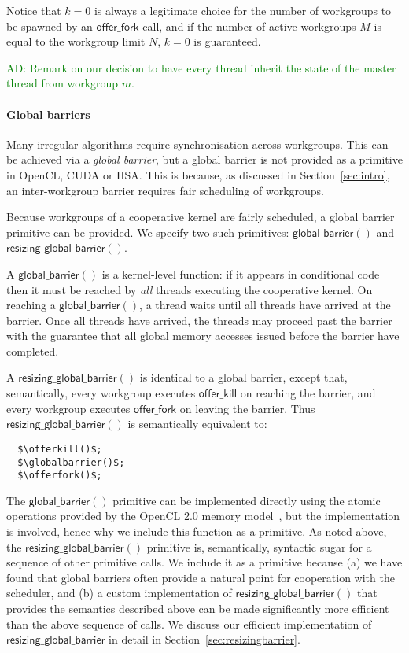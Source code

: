 \documentclass[nocopyrightspace]{sigplanconf-pldi16}
\newcommand{\ADComment}[1]{\textcolor{green}{AD: #1}}
\newcommand{\offerfork}{\mathsf{offer\_fork}}
\newcommand{\offerkill}{\mathsf{offer\_kill}}
\newcommand{\globalbarrier}{\mathsf{global\_barrier}}
\newcommand{\resizingglobalbarrier}{\mathsf{resizing\_global\_barrier}}
\begin{document}
Notice that $k=0$ is always a legitimate choice for the number of
workgroups to be spawned by an $\offerfork$ call, and if the number of
active workgroups $M$ is equal to the workgroup limit $N$, $k=0$ is
guaranteed.

\ADComment{Remark on our decision to have every thread inherit the
  state of the master thread from workgroup $m$.}

\paragraph{Global barriers}

Many irregular algorithms require synchronisation across workgroups.
This can be achieved via a \emph{global barrier}, but a global barrier
is not provided as a primitive in OpenCL, CUDA or HSA.  This is
because, as discussed in Section~\ref{sec:intro}, an inter-workgroup barrier
requires fair scheduling of workgroups.

Because workgroups of a cooperative kernel are fairly scheduled, a
global barrier primitive can be provided.  We specify two such primitives: $\globalbarrier()$
and $\resizingglobalbarrier()$.

A $\globalbarrier()$ is a kernel-level function: if it appears in
conditional code then it must be reached by \emph{all} threads
executing the cooperative kernel.  On reaching a $\globalbarrier()$, a
thread waits until all threads have arrived at the barrier.  Once all
threads have arrived, the threads may proceed past the barrier with
the guarantee that all global memory accesses issued before the
barrier have completed.

A $\resizingglobalbarrier()$ is identical to a global barrier, except
that, semantically, every workgroup executes $\offerkill$ on reaching
the barrier, and every workgroup executes $\offerfork$ on leaving the
barrier.  Thus $\resizingglobalbarrier()$ is semantically equivalent to:
%
\lstset{basicstyle=\tt}
\begin{lstlisting}
  $\offerkill()$;
  $\globalbarrier()$;
  $\offerfork()$;
\end{lstlisting}
\lstset{basicstyle=\scriptsize\tt}

The $\globalbarrier()$ primitive can be implemented directly using the
atomic operations provided by the OpenCL 2.0 memory model~\cite{...},
but the implementation is involved, hence why we include this function
as a primitive.  As noted above, the $\resizingglobalbarrier()$
primitive is, semantically, syntactic sugar for a sequence of other
primitive calls.  We include it as a primitive because (a) we have
found that global barriers often provide a natural point for
cooperation with the scheduler, and (b) a custom implementation of
$\resizingglobalbarrier()$ that provides the semantics described
above can be made significantly more efficient than the above sequence of
calls.  We discuss our efficient implementation of
$\resizingglobalbarrier$ in detail in Section~\ref{sec:resizingbarrier}.
\end{document}
